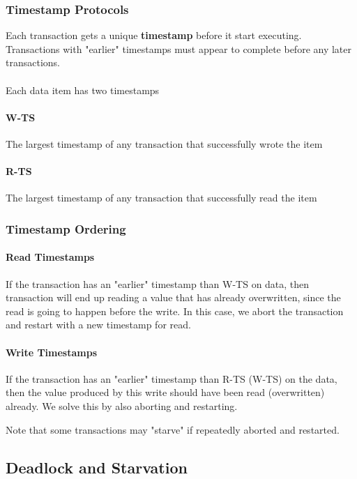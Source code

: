 \documentclass{article}
\begin{document}
\subsubsection{Timestamp Protocols}

Each transaction gets a unique \textbf{timestamp} before it start executing. Transactions with "earlier" timestamps must appear to complete before any later transactions.
\\
\\
Each data item has two timestamps
\paragraph{W-TS} The largest timestamp of any transaction that successfully wrote the item
\paragraph{R-TS} The largest timestamp of any transaction that successfully read the item

\subsubsection{Timestamp Ordering}

\paragraph{Read Timestamps} If the transaction has an "earlier" timestamp than W-TS on data, then transaction will end up reading a value that has already overwritten, since the read is going to happen before the write. In this case, we abort the transaction and restart with a new timestamp for read.

\paragraph{Write Timestamps} If the transaction has an "earlier" timestamp than R-TS (W-TS) on the data, then the value produced by this write should have been read (overwritten) already. We solve this by also aborting and restarting.

Note that some transactions may "starve" if repeatedly aborted and restarted.

\subsection{Deadlock and Starvation}
\end{document}
